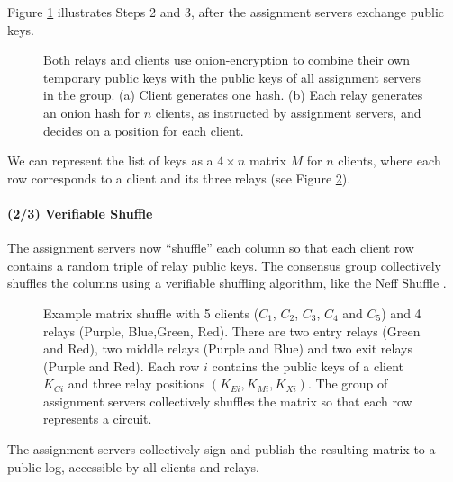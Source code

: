 Figure \ref{figure:transfer} illustrates Steps 2 and 3, after the assignment
servers exchange public keys.

\begin{figure}[htbp]
  \centering
  
  \caption{Both relays and clients use onion-encryption to combine their own
  temporary public keys with the public keys of all assignment servers in the group. (a) Client generates one hash. (b) Each relay generates an onion hash for $n$ clients, as instructed by assignment servers, and decides on a position
  for each client.}
  \label{figure:transfer}
\end{figure}

We can represent the list of keys as a $4 \times n$ matrix $M$ for $n$
clients, where each row corresponds to a client and its three relays (see
Figure \ref{figure:shuffle}).

\paragraph{(2/3) Verifiable Shuffle} The assignment servers now ``shuffle''
each column so that each client row contains a random triple of relay public
keys. The consensus group collectively shuffles the columns using a verifiable
shuffling algorithm, like the Neff Shuffle \cite{neff2001verifiable}.

\begin{figure}[htb]
\centering
\hspace{\fill}%
\hspace{\fill}%
\hspace*{\fill}%
\caption[bla]{
Example matrix shuffle with 5 clients ($C_1$, $C_2$, $C_3$, $C_4$ and $C_5$) and 4
relays (Purple, Blue,Green, Red). There are two entry relays (Green and Red),
two middle relays (Purple and Blue) and two exit relays (Purple and Red). Each
row $i$ contains the public keys of a client $K_{Ci}$ and three relay positions
$(K_{Ei}, K_{Mi}, K_{Xi})$. The group of assignment servers collectively shuffles
the matrix so that each row represents a circuit.}
\label{figure:shuffle}
\end{figure}

The assignment servers collectively sign and publish the resulting matrix to a
public log, accessible by all clients and relays.

